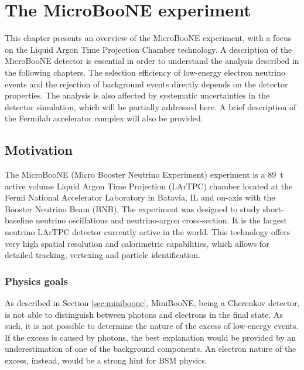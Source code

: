 \chapter{The MicroBooNE experiment}

\minitoc


This chapter presents an overview of the MicroBooNE experiment, with a focus on the Liquid Argon Time Projection Chamber technology. A description of the MicroBooNE detector is essential in order to understand the analysis described in the following chapters. The selection efficiency of low-energy electron neutrino events and the rejection of background events directly depends on the detector properties. The analysis is also affected by systematic uncertainties in the detector simulation, which will be partially addressed here. A brief description of the Fermilab accelerator complex will also be provided.

\section{Motivation}
The MicroBooNE (Micro Booster Neutrino Experiment) experiment is a 89~t active volume Liquid Argon Time Projection (LArTPC) chamber located at the Fermi National Accelerator Laboratory in Batavia, IL and on-axis with the Booster Neutrino Beam (BNB). The experiment was designed to study short-baseline neutrino oscillations and neutrino-argon cross-section. It is the largest neutrino LArTPC detector currently active in the world.
This technology offers very high spatial resolution and calorimetric capabilities, which allows for detailed tracking, vertexing and particle identification. 

\subsection{Physics goals}
As described in Section \ref{sec:miniboone}, MiniBooNE, being a Cherenkov detector, is not able to distinguish between photons and electrons in the final state. As such, it is not possible to determine the nature of the excess of low-energy events. If the excess is caused by photons, the best explanation would be provided by an underestimation of one of the background components. An electron nature of the excess, instead, would be a strong hint for BSM physics.

